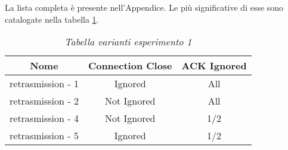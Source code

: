 La lista completa è presente nell'Appendice. Le più significative di esse sono catalogate nella tabella \ref{table-retransmission}.
\begin{table}[!h]
    \centering
    \begin{tabular}{|c|c|c|}
        \hline
        \textbf{Nome} & \textbf{Connection Close} & \textbf{ACK Ignored} \\
        \hline
        retrasmission - 1  & Ignored & All \\
        \hline
        retrasmission - 2 & Not Ignored & All \\
        \hline
        retrasmission - 4 & Not Ignored & 1/2 \\
        \hline
        retrasmission - 5 & Ignored & 1/2 \\
        \hline
    \end{tabular}
    \caption{\emph{Tabella varianti esperimento 1}}
    \label{table-retransmission}
\end{table}

